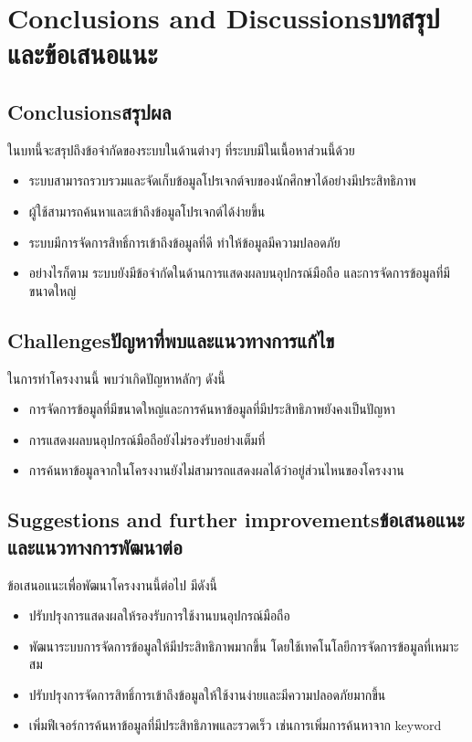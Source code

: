 \chapter{\ifenglish Conclusions and Discussions\else บทสรุปและข้อเสนอแนะ\fi}

\section{\ifenglish Conclusions\else สรุปผล\fi}

\hspace{1.27cm}ในบทนี้จะสรุปถึงข้อจำกัดของระบบในด้านต่างๆ ที่ระบบมีในเนื้อหาส่วนนี้ด้วย
\begin{itemize}
  \item ระบบสามารถรวบรวมและจัดเก็บข้อมูลโปรเจกต์จบของนักศึกษาได้อย่างมีประสิทธิภาพ
  \item ผู้ใช้สามารถค้นหาและเข้าถึงข้อมูลโปรเจกต์ได้ง่ายขึ้น
  \item ระบบมีการจัดการสิทธิ์การเข้าถึงข้อมูลที่ดี ทำให้ข้อมูลมีความปลอดภัย
  \item อย่างไรก็ตาม ระบบยังมีข้อจำกัดในด้านการแสดงผลบนอุปกรณ์มือถือ และการจัดการข้อมูลที่มีขนาดใหญ่
\end{itemize}

\section{\ifenglish Challenges\else ปัญหาที่พบและแนวทางการแก้ไข\fi}

\hspace{1.27cm}ในการทำโครงงานนี้ พบว่าเกิดปัญหาหลักๆ ดังนี้
\begin{itemize}
  \item การจัดการข้อมูลที่มีขนาดใหญ่และการค้นหาข้อมูลที่มีประสิทธิภาพยังคงเป็นปัญหา
  \item การแสดงผลบนอุปกรณ์มือถือยังไม่รองรับอย่างเต็มที่
  \item การค้นหาข้อมูลจากในโครงงานยังไม่สามารถแสดงผลได้ว่าอยู่ส่วนไหนของโครงงาน
\end{itemize}

\section{\ifenglish Suggestions and further improvements\else ข้อเสนอแนะและแนวทางการพัฒนาต่อ\fi}

\hspace{1.27cm}ข้อเสนอแนะเพื่อพัฒนาโครงงานนี้ต่อไป มีดังนี้
\begin{itemize}
  \item ปรับปรุงการแสดงผลให้รองรับการใช้งานบนอุปกรณ์มือถือ
  \item พัฒนาระบบการจัดการข้อมูลให้มีประสิทธิภาพมากขึ้น โดยใช้เทคโนโลยีการจัดการข้อมูลที่เหมาะสม
  \item ปรับปรุงการจัดการสิทธิ์การเข้าถึงข้อมูลให้ใช้งานง่ายและมีความปลอดภัยมากขึ้น
  \item เพิ่มฟีเจอร์การค้นหาข้อมูลที่มีประสิทธิภาพและรวดเร็ว เช่นการเพิ่มการค้นหาจาก keyword
\end{itemize}